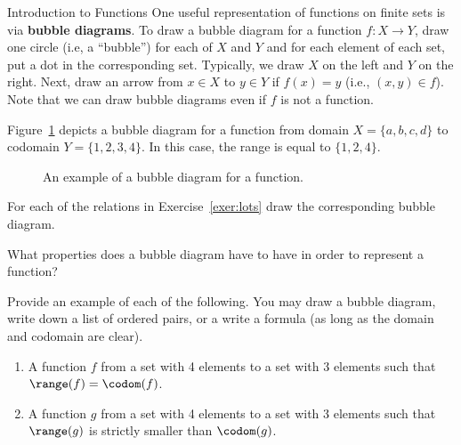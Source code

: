 \begin{section}{Introduction to Functions}
One useful representation of functions on finite sets is via \textbf{bubble diagrams}.  To draw a bubble diagram for a function $f:X\to Y$, draw one circle (i.e, a ``bubble'') for each of $X$ and $Y$ and for each element of each set, put a dot in the corresponding set.  Typically, we draw $X$ on the left and $Y$ on the right.  Next, draw an arrow from $x\in X$ to $y\in Y$ if $f(x)=y$ (i.e., $(x,y)\in f$). Note that we can draw bubble diagrams even if $f$ is not a function. 

\begin{example}
Figure~\ref{fig:bubble} depicts a bubble diagram for a function from domain $X=\{a,b,c,d\}$ to codomain $Y=\{1,2,3,4\}$. In this case, the range is equal to $\{1,2,4\}$.
\end{example} 

\begin{figure}
\centering
{}
\caption{An example of a bubble diagram for a function.}\label{fig:bubble}
\end{figure}

\begin{exercise}
For each of the relations in Exercise~\ref{exer:lots} draw the corresponding bubble diagram.
\end{exercise}

\begin{problem}
What properties does a bubble diagram have to have in order to represent a function?
\end{problem}

\begin{exercise}
Provide an example of each of the following.  You may draw a bubble diagram, write down a list of ordered pairs, or a write a formula (as long as the domain and codomain are clear).
\begin{enumerate}[label=\textrm{(\alph*)}]
\item A function $f$ from a set with 4 elements to a set with 3 elements such that $\range(f)=\codom(f)$.
\item A function $g$ from a set with 4 elements to a set with 3 elements such that $\range(g)$ is strictly smaller than $\codom(g)$.
\end{enumerate}
\end{exercise}


\end{section}
